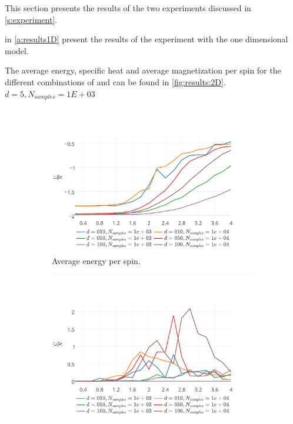 This section presents the results of the two experiments discussed in \cref{s:experiment}.

 in \cref{a:results1D} present the results of the experiment with the one dimensional model.

The average energy, specific heat and average magnetization per spin for the different combinations of \numberOfSpins and \numberOfSamples can be found in \cref{fig:results:2D}. $d = 5, N_\textit{samples} = 1E+03$

\begin{figure}
	\centering
	\begin{subfigure}{\columnwidth}
		\centering
		\includegraphics[width=\textwidth]{./img/2D/averageEnergy}
		\caption{Average energy per spin.}
		\label{fig:results:2D:averageEnergy}
	\end{subfigure}
	\begin{subfigure}{\columnwidth}
		\centering
		\includegraphics[width=\textwidth]{./img/2D/specificHeat}

\end{subfigure}
\end{figure}

